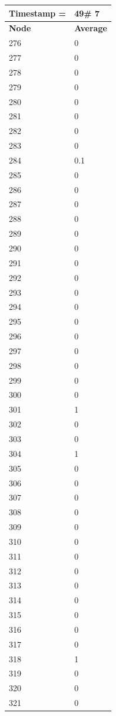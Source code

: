 \begin{tabular}{|l||l|}
\hline
\textbf{Timestamp =} & \textbf{49}\# 7\\\hline
	\textbf{Node} & \textbf{Average} \\ \hline
\hline
	276 & 0 \\ \hline
	277 & 0 \\ \hline
	278 & 0 \\ \hline
	279 & 0 \\ \hline
	280 & 0 \\ \hline
	281 & 0 \\ \hline
	282 & 0 \\ \hline
	283 & 0 \\ \hline
	284 & 0.1 \\ \hline
	285 & 0 \\ \hline
	286 & 0 \\ \hline
	287 & 0 \\ \hline
	288 & 0 \\ \hline
	289 & 0 \\ \hline
	290 & 0 \\ \hline
	291 & 0 \\ \hline
	292 & 0 \\ \hline
	293 & 0 \\ \hline
	294 & 0 \\ \hline
	295 & 0 \\ \hline
	296 & 0 \\ \hline
	297 & 0 \\ \hline
	298 & 0 \\ \hline
	299 & 0 \\ \hline
	300 & 0 \\ \hline
	301 & 1 \\ \hline
	302 & 0 \\ \hline
	303 & 0 \\ \hline
	304 & 1 \\ \hline
	305 & 0 \\ \hline
	306 & 0 \\ \hline
	307 & 0 \\ \hline
	308 & 0 \\ \hline
	309 & 0 \\ \hline
	310 & 0 \\ \hline
	311 & 0 \\ \hline
	312 & 0 \\ \hline
	313 & 0 \\ \hline
	314 & 0 \\ \hline
	315 & 0 \\ \hline
	316 & 0 \\ \hline
	317 & 0 \\ \hline
	318 & 1 \\ \hline
	319 & 0 \\ \hline
	320 & 0 \\ \hline
	321 & 0 \\ \hline
\end{tabular}
